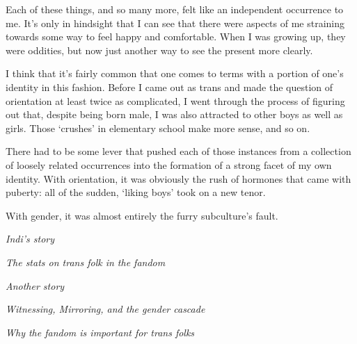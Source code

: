 Each of these things, and so many more, felt like an independent occurrence to me.  It's only in hindsight that I can see that there were aspects of me straining towards some way to feel happy and comfortable.  When I was growing up, they were oddities, but now just another way to see the present more clearly.

I think that it's fairly common that one comes to terms with a portion of one's identity in this fashion.  Before I came out as trans and made the question of orientation at least twice as complicated, I went through the process of figuring out that, despite being born male, I was also attracted to other boys as well as girls.  Those `crushes' in elementary school make more sense, and so on.

There had to be some lever that pushed each of those instances from a collection of loosely related occurrences into the formation of a strong facet of my own identity.  With orientation, it was obviously the rush of hormones that came with puberty: all of the sudden, `liking boys' took on a new tenor.

With gender, it was almost entirely the furry subculture's fault.

\secdiv

\textit{Indi's story}

\secdiv

\textit{The stats on trans folk in the fandom}

\secdiv

\textit{Another story}

\secdiv

\textit{Witnessing, Mirroring, and the gender cascade}

\textit{Why the fandom is important for trans folks}
